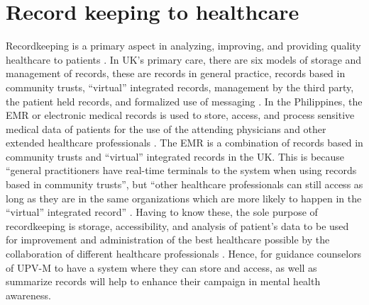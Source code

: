\section{Record keeping to healthcare}
Recordkeeping is a primary aspect in analyzing, improving, and providing quality healthcare to patients . In UK’s primary care, there are six models of storage and management of records, these are records in general practice, records based in community trusts, “virtual” integrated records, management by the third party, the patient held records, and formalized use of messaging \cite{rigby1998integrated}. In the Philippines, the EMR or electronic medical records is used to store, access, and process sensitive medical data of patients for the use of the attending physicians and other extended healthcare professionals \cite{ebardo2019barriers}. The EMR is a combination of records based in community trusts and “virtual” integrated records in the UK. This is because “general practitioners have real-time terminals to the system when using records based in community trusts”, but “other healthcare professionals can still access as long as they are in the same organizations which are more likely to happen in the “virtual” integrated record” \cite{rigby1998integrated}. Having to know these, the sole purpose of recordkeeping is storage, accessibility, and analysis of patient's data to be used for improvement and administration of the best healthcare possible by the collaboration of different healthcare professionals \cite{rigby1998integrated, ebardo2019barriers}. Hence, for guidance counselors of UPV-M to have a system where they can store and access, as well as summarize records will help to enhance their campaign in mental health awareness. 


